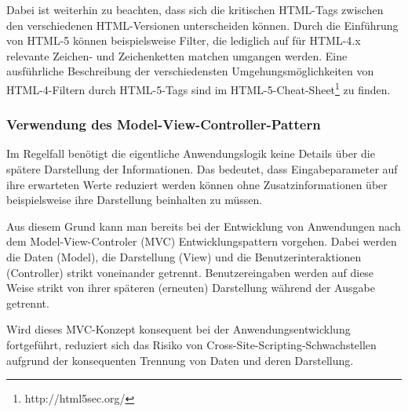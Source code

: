 Dabei ist weiterhin zu beachten, dass sich die kritischen HTML-Tags 
zwischen den verschiedenen HTML-Versionen unterscheiden können. 
Durch die Einführung von HTML-5 können beispielsweise Filter, die 
lediglich auf für HTML-4.x relevante Zeichen- und Zeichenketten 
matchen umgangen werden. Eine ausführliche Beschreibung der 
verschiedensten Umgehungsmöglichkeiten von HTML-4-Filtern durch 
HTML-5-Tags sind im HTML-5-Cheat-Sheet\footnote{http://html5sec.org/} 
zu finden.

\subsubsection{Verwendung des Model-View-Controller-Pattern}

Im Regelfall benötigt die eigentliche Anwendungslogik keine Details 
über die spätere Darstellung der Informationen. Das bedeutet, dass 
Eingabeparameter auf ihre erwarteten Werte reduziert werden können 
ohne Zusatzinformationen über beispielsweise ihre Darstellung beinhalten 
zu müssen.

Aus diesem Grund kann man bereits bei der Entwicklung von Anwendungen 
nach dem Model-View-Controler (MVC) Entwicklungspattern vorgehen. Dabei 
werden die Daten (Model), die Darstellung (View) und die 
Benutzerinteraktionen (Controller) strikt voneinander getrennt. 
Benutzereingaben werden auf diese Weise strikt von ihrer späteren 
(erneuten) Darstellung während der Ausgabe getrennt.

Wird dieses MVC-Konzept konsequent bei der Anwendungsentwicklung 
fortgeführt, reduziert sich das Risiko von Cross-Site-Scripting-Schwachstellen 
aufgrund der konsequenten Trennung von Daten und deren Darstellung.

